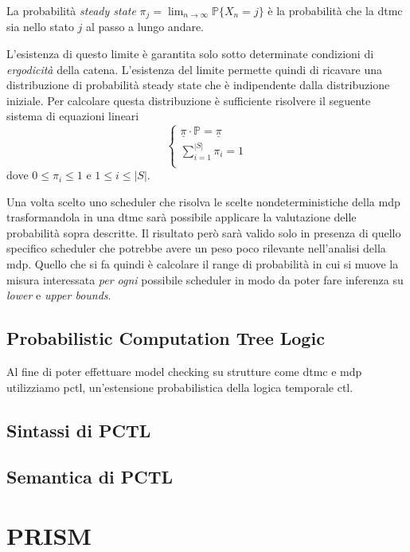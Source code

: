\begin{mtdef}
La probabilità \emph{steady state} $\pi_j = \lim_{n\rightarrow\infty} \mathbb{P}\{X_n = j\}$ è la probabilità che la \ac{dtmc} sia nello stato $j$ al passo a lungo andare.
\end{mtdef}

L'esistenza di questo limite è garantita solo sotto determinate condizioni di \emph{ergodicità} della catena. L'esistenza del limite permette quindi di ricavare una distribuzione di probabilità steady state che è indipendente dalla distribuzione iniziale. Per calcolare questa distribuzione è sufficiente risolvere il seguente sistema di equazioni lineari
$$
\left\{
\begin{array}{l}
\underline\pi \cdot \mathbb{P} = \underline\pi \\
\sum^{|S|}_{i=1} \pi_i = 1 \\
\end{array}
\right.
$$
dove $0 \leq \pi_i \leq 1$ e $1 \leq i \leq |S|$.

Una volta scelto uno scheduler che risolva le scelte nondeterministiche della \ac{mdp} trasformandola in una \ac{dtmc} sarà possibile applicare la valutazione delle probabilità sopra descritte. Il risultato però sarà valido solo in presenza di quello specifico scheduler che potrebbe avere un peso poco rilevante nell'analisi della \ac{mdp}. Quello che si fa quindi è calcolare il range di probabilità in cui si muove la misura interessata \emph{per ogni} possibile scheduler in modo da poter fare inferenza su \emph{lower} e \emph{upper bounds}.

\subsection{Probabilistic Computation Tree Logic}
Al fine di poter effettuare model checking su strutture come \ac{dtmc} e \ac{mdp} utilizziamo \ac{pctl}, un'estensione probabilistica della logica temporale \ac{ctl}.

\subsection{Sintassi di PCTL}


\subsection{Semantica di PCTL}



\section{PRISM}

